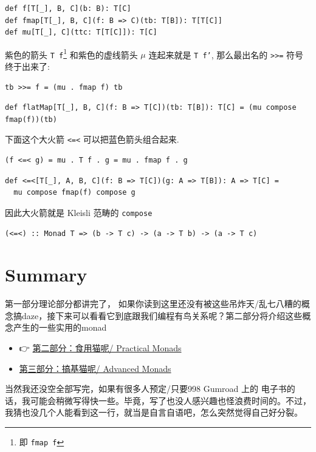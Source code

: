 \documentclass[11pt]{tufte-book}
\begin{document}
\begin{verbatim}
def f[T[_], B, C](b: B): T[C]
def fmap[T[_], B, C](f: B => C)(tb: T[B]): T[T[C]]
def mu[T[_], C](ttc: T[T[C]]): T[C]
\end{verbatim}

紫色的箭头 \texttt{T f}\footnote{即 \texttt{fmap f}} 和紫色的虚线箭头 \(\mu\) 连起来就是 \texttt{T f'}, 那么最出名的 \texttt{>>=} 符号终于出来了:
\begin{verbatim}
tb >>= f = (mu . fmap f) tb
\end{verbatim}

\begin{verbatim}
def flatMap[T[_], B, C](f: B => T[C])(tb: T[B]): T[C] = (mu compose fmap(f))(tb)
\end{verbatim}

下面这个大火箭 \texttt{<=<} 可以把蓝色箭头组合起来.
\begin{verbatim}
(f <=< g) = mu . T f . g = mu . fmap f . g
\end{verbatim}

\begin{verbatim}
def <=<[T[_], A, B, C](f: B => T[C])(g: A => T[B]): A => T[C] =
  mu compose fmap(f) compose g
\end{verbatim}

因此大火箭就是 Kleisli 范畴的 \texttt{compose}

\begin{verbatim}
(<=<) :: Monad T => (b -> T c) -> (a -> T b) -> (a -> T c)
\end{verbatim}

\chapter{Summary}
\label{sec:org493098f}
第一部分理论部分都讲完了， 如果你读到这里还没有被这些吊炸天/乱七八糟的概念搞daze，接下来可以看看它到底跟我们编程有鸟关系呢？第二部分将介绍这些概念产生的一些实用的monad

\begin{itemize}
\item 👉 \href{./part2.org}{第二部分：食用猫呢/ Practical Monads}
\item \href{./part3.org}{第三部分：搞基猫呢/ Advanced Monads}
\end{itemize}

当然我还没空全部写完，如果有很多人预定/只要998 Gumroad 上的  电子书的话，我可能会稍微写得快一些。毕竟，写了也没人感兴趣也怪浪费时间的。不过，我猜也没几个人能看到这一行，就当是自言自语吧，怎么突然觉得自己好分裂。
\end{document}

